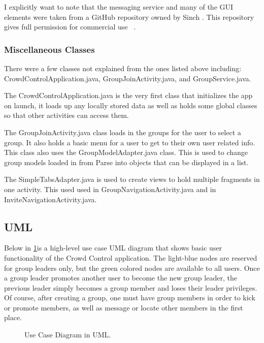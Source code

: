 I explicitly want to note that the messaging service and many of the GUI elements were taken from a GitHub repository owned by Sinch \cite{sinch:github}. This repository gives full permission for commercial use ~\cite{Choset: License, https://github.com/sinch/android-messaging-tutorial/blob/master/LICENSE}.

	\subsubsection{Miscellaneous Classes}
	There were a few classes not explained from the ones listed above including: CrowdControlApplication.java, GroupJoinActivity.java, and GroupService.java.
	
	The CrowdControlApplication.java is the very first class that initializes the app on launch, it loads up any locally stored data as well as holds some global classes so that other activities can access them.
	
	The GroupJoinActivity.java class loads in the groups for the user to select a group. It also holds a basic menu for a user to get to their own user related info. This class also uses the GroupModelAdapter.java class. This is used to change group models loaded in from Parse into objects that can be displayed in a list.
	
	The SimpleTabsAdapter.java is used to create views to hold multiple fragments in one activity. This used used in GroupNavigationActivity.java and in InviteNavigationActivity.java.

 \subsection{UML}
 Below in \ref{UseCaseUML}is a high-level use case UML diagram that shows basic user functionality of the Crowd Control application. The light-blue nodes are reserved for group leaders only, but the green colored nodes are available to all users. Once a group leader promotes another user to become the new group leader, the previous leader simply becomes a group member and loses their leader privileges. Of course, after creating a group, one must have group members in order to kick or promote members, as well as message or locate other members in the first place.
 
 	\begin{figure}[tbh!]
	\begin{center}
	\end{center}
	\caption{Use Case Diagram in UML. \label{UseCaseUML}}
	\end{figure}
 

